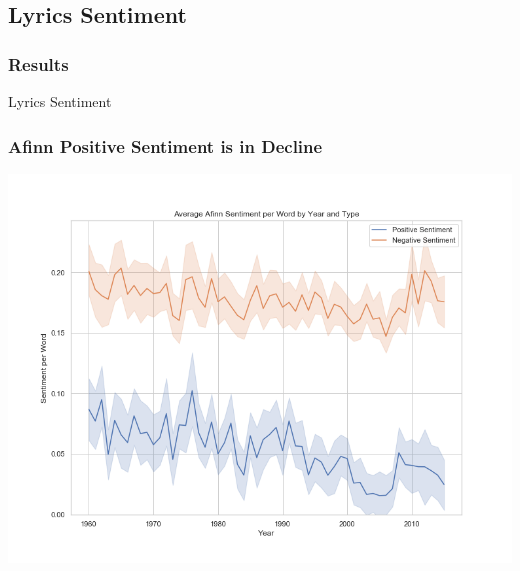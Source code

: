 \documentclass[10pt]{beamer}
\begin{document}
\subsection{Lyrics Sentiment}

\begin{frame}
\frametitle{Results}

\LARGE{\centerline{Lyrics Sentiment}}

\end{frame}

\begin{frame}
\frametitle{Afinn Positive Sentiment is in Decline}

{
    \centering
    \includegraphics[width=\textwidth, height=\textheight,keepaspectratio]{average_afinn_sentiment_by_year.png}
    \par
}

\end{frame}
\end{document}
